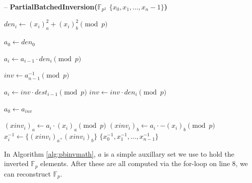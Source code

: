 \begin{algorithm}
\caption{-- \textbf{PartialBatchedInversion($\mathbb{F}_{p^{2}}$ $\{x_0, x_1, ..., x_n-1\}$)}}\label{alg:pbinvmath}
\begin{algorithmic}[1]
	\State $den_{i} \gets (x_i)_{a}^{2} + (x_i)_{b}^{2} \pmod{p}$
\EndFor

\State $a_0 \gets den_0$

	\State $a_i \gets a_{i-1} \cdot den_i \pmod{p}$
\EndFor

\State $inv \gets a_{n-1}^{-1} \pmod{p}$

	\State $a_i \gets inv \cdot dest_{i-1} \pmod{p}$
	\State $inv \gets inv \cdot den_i \pmod{p}$
\EndFor

\State $a_0 \gets a_{inv}$

	\State $(xinv_i)_a \gets a_i \cdot (x_i)_a \pmod{p}$
	\State $(xinv_i)_b \gets a_i \cdot -(x_i)_b \pmod{p}$
	\State $x_i^{-1} \gets \{(xinv_i)_a, (xinv_i)_b\}$
\EndFor
\State \Return $\{x_0^{-1}, x_1^{-1}, ..., x_{n-1}^{-1}\}$
\end{algorithmic}
\end{algorithm}
\noindent

In Algorithm \ref{alg:pbinvmath}, $a$ is a simple auxillary set we use to hold the inverted $\mathbb{F}_{p}$ elements. After these are all computed via the for-loop on line 8, we can reconstruct $\mathbb{F}_{p}$.

